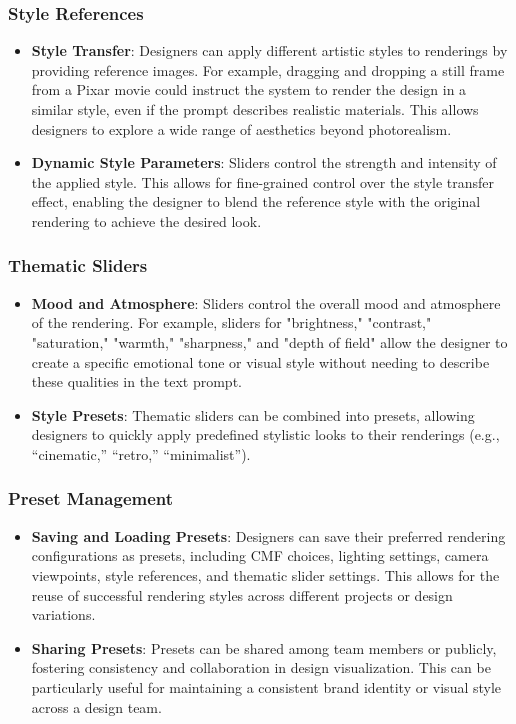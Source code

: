 \documentclass[12pt]{report}
\begin{document}
\subsubsection{Style References}
\begin{itemize}
\item \textbf{Style Transfer}: Designers can apply different artistic styles to renderings by providing reference images. For example, dragging and dropping a still frame from a Pixar movie could instruct the system to render the design in a similar style, even if the prompt describes realistic materials. This allows designers to explore a wide range of aesthetics beyond photorealism.
\item \textbf{Dynamic Style Parameters}: Sliders control the strength and intensity of the applied style. This allows for fine-grained control over the style transfer effect, enabling the designer to blend the reference style with the original rendering to achieve the desired look.
\end{itemize}

\subsubsection{Thematic Sliders}
\begin{itemize}
\item \textbf{Mood and Atmosphere}: Sliders control the overall mood and atmosphere of the rendering. For example, sliders for "brightness," "contrast," "saturation," "warmth," "sharpness," and "depth of field" allow the designer to create a specific emotional tone or visual style without needing to describe these qualities in the text prompt.
\item \textbf{Style Presets}: Thematic sliders can be combined into presets, allowing designers to quickly apply predefined stylistic looks to their renderings (e.g., “cinematic,” “retro,” “minimalist”).
\end{itemize}

\subsubsection{Preset Management}
\begin{itemize}
\item \textbf{Saving and Loading Presets}: Designers can save their preferred rendering configurations as presets, including CMF choices, lighting settings, camera viewpoints, style references, and thematic slider settings. This allows for the reuse of successful rendering styles across different projects or design variations.
\item \textbf{Sharing Presets}: Presets can be shared among team members or publicly, fostering consistency and collaboration in design visualization. This can be particularly useful for maintaining a consistent brand identity or visual style across a design team.
\end{itemize}
\end{document}
